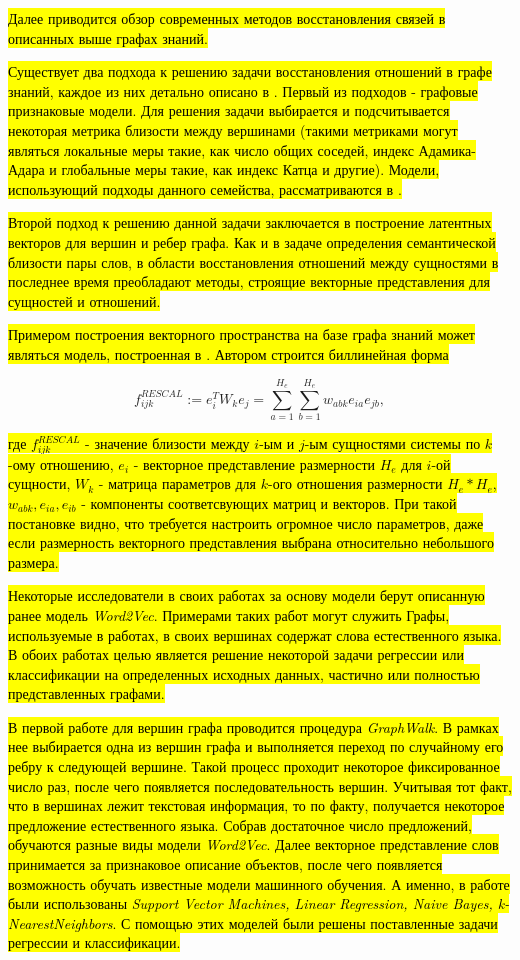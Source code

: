 \hl{Далее приводится обзор современных методов восстановления связей в описанных выше графах знаний.}

\hl{Существует два подхода к решению задачи восстановления отношений в графе знаний, каждое из них детально описано в \cite{rel_ml}. Первый из подходов - графовые признаковые модели. Для решения задачи выбирается и подсчитывается некоторая метрика близости между вершинами (такими метриками могут являться локальные меры такие, как число общих соседей, индекс Адамика-Адара и глобальные меры такие, как индекс Катца и другие). Модели, использующий подходы данного семейства, рассматриваются в \cite{Adamic, Barabasi, RePEc, Leicht}. }

\hl{Второй подход к решению данной задачи заключается в построение латентных векторов для вершин и ребер графа. Как и в задаче определения семантической близости пары слов, в области  восстановления отношений между сущностями в последнее время преобладают методы, строящие векторные представления для сущностей и отношений. }

\hl{Примером построения векторного пространства на базе графа знаний может являться модель, построенная в \cite{phd_nickel13}. Автором строится биллинейная форма }

$$ f_{ijk}^{RESCAL} := e_i^TW_ke_j  = \sum_{a=1}^{H_e}\sum_{b=1}^{H_e}w_{abk}e_{ia}e_{jb},$$ 

\hl{где $f_{ijk}^{RESCAL}$ - значение близости между $i$-ым и $j$-ым сущностями системы по $k$-ому отношению, $e_i$ - векторное представление размерности $H_e$ для $i$-ой сущности, $W_k$ - матрица параметров для $k$-ого отношения размерности $H_e * H_e$, $w_{abk},e_{ia},e_{ib}$ - компоненты соответсвующих матриц и векторов. При такой постановке видно, что требуется настроить огромное число параметров, даже если размерность векторного представления выбрана относительно небольшого размера.}

\hl{Некоторые исследователи в своих работах за основу модели берут описанную ранее модель \emph{Word2Vec}. Примерами таких работ могут служить \cite{graph_emb,kg2vec} Графы, используемые в работах, в своих вершинах содержат слова естественного языка. В обоих работах целью является решение некоторой задачи регрессии или классификации на определенных исходных данных, частично или полностью представленных графами.}

\hl{В первой работе для вершин графа проводится процедура \emph{GraphWalk}. В рамках нее выбирается одна из вершин графа и выполняется переход по случайному его ребру к следующей вершине. Такой процесс проходит некоторое фиксированное число раз, после чего появляется последовательность вершин. Учитывая тот факт, что в вершинах лежит текстовая информация, то по факту, получается некоторое предложение естественного языка. Собрав достаточное число предложений, обучаются разные виды модели \emph{Word2Vec}. Далее векторное представление слов  принимается за признаковое описание объектов, после чего появляется возможность обучать известные модели машинного обучения. А именно, в работе были использованы \emph{Support Vector Machines, Linear Regression, Naive Bayes, k-NearestNeighbors}. С помощью этих моделей были решены поставленные задачи регрессии и классификации.}


